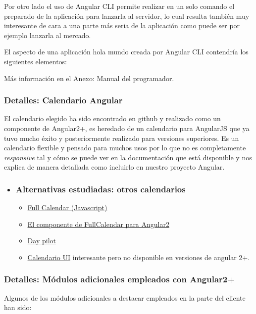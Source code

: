 Por otro lado el uso de Angular CLI permite realizar en un solo comando el preparado de la aplicación para lanzarla al servidor, lo cual resulta también muy interesante de cara a una parte más seria de la aplicación como puede ser por ejemplo lanzarla al mercado.

El aspecto de una aplicación hola mundo creada por Angular CLI contendría los siguientes elementos:


Más información en el Anexo: Manual del programador. 

\subsubsection{Detalles: Calendario Angular}\label{detalle_calendario}
El calendario elegido ha sido encontrado en github y realizado como un componente de Angular2+, es heredado de un calendario para AngularJS que ya tuvo mucho éxito y posteriormente realizado para versiones superiores. Es un calendario flexible y pensado para muchos usos por lo que no es completamente \emph{responsive} tal y cómo se puede ver en la documentación \cite{calendariodocs}  que está disponible y nos explica de manera detallada como incluirlo en nuestro proyecto Angular.

\begin{itemize}
	\item \subsubsection{Alternativas estudiadas: otros calendarios} 
	\begin{itemize}
		\item \hyperlink{https://fullcalendar.io/}{Full Calendar (Javascript)}
		\item \hyperlink{https://github.com/nekken/ng2-fullcalendar}{El componente de FullCalendar para Angular2}
		\item \hyperlink{https://doc.daypilot.org/calendar/angular-2/}{Day pilot }
		\item \hyperlink{http://angular-ui.github.io/ui-calendar/}{Calendario UI} interesante pero no disponible en versiones de angular 2+.
	\end{itemize}
	\end{itemize}

\subsubsection{Detalles: Módulos adicionales empleados con Angular2+}\label{detalle_angularmodulos}
Algunos de los módulos adicionales a destacar empleados en la parte del cliente han sido:

